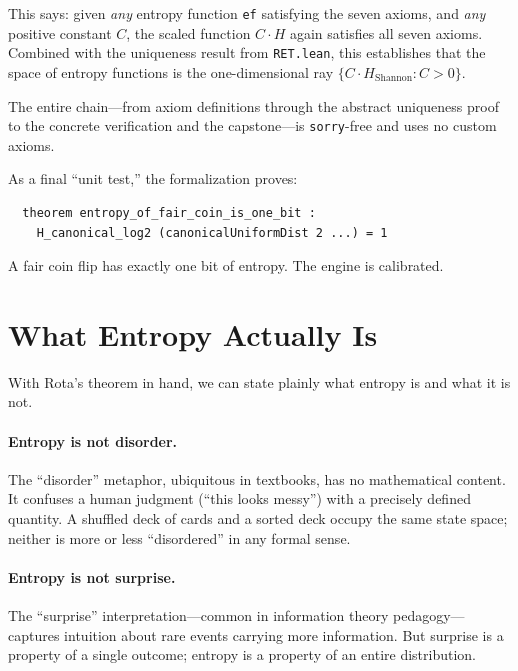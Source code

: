 \documentclass[12pt,a4paper]{article}
\theoremstyle{definition}
\newcommand{\lean}[1]{\texttt{#1}}
\begin{document}
\noindent
This says: given \emph{any} entropy function \lean{ef} satisfying the
seven axioms, and \emph{any} positive constant $C$, the scaled function
$C \cdot H$ again satisfies all seven axioms.  Combined with the
uniqueness result from \lean{RET.lean}, this establishes that the space
of entropy functions is the one-dimensional ray
$\{C \cdot H_{\mathrm{Shannon}} : C > 0\}$.

The entire chain---from axiom definitions through the abstract
uniqueness proof to the concrete verification and the capstone---is
\lean{sorry}-free and uses no custom axioms.

As a final ``unit test,'' the formalization proves:

\begin{verbatim}
  theorem entropy_of_fair_coin_is_one_bit :
    H_canonical_log2 (canonicalUniformDist 2 ...) = 1
\end{verbatim}

\noindent
A fair coin flip has exactly one bit of entropy.  The engine is
calibrated.

\section{What Entropy Actually Is}
\label{sec:what}

With Rota's theorem in hand, we can state plainly what entropy is and
what it is not.

\paragraph{Entropy is not disorder.}
The ``disorder'' metaphor, ubiquitous in textbooks, has no mathematical
content.  It confuses a human judgment (``this looks messy'') with a
precisely defined quantity.  A shuffled deck of cards and a sorted deck
occupy the same state space; neither is more or less ``disordered'' in
any formal sense.

\paragraph{Entropy is not surprise.}
The ``surprise'' interpretation---common in information theory
pedagogy---captures intuition about rare events carrying more
information.  But surprise is a property of a single outcome;
entropy is a property of an entire distribution.
\end{document}

